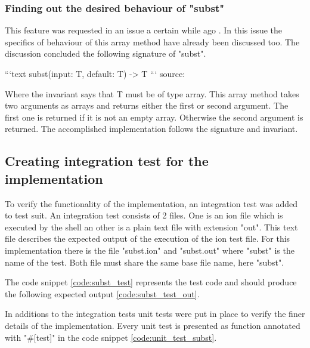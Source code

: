 \subsubsection{Finding out the desired behaviour of "subst"}\label{subst_desired_behaviour}

This feature was requested in an issue a certain while ago \cite{issue_subst_request}.
In this issue the specifics of behaviour of this array method have already been discussed too.
The discussion concluded the following signature of "subst".

```text
subst(input: T, default: T) -> T
```
source: \cite{issue_subst_request}

Where the invariant says that T must be of type array.
This array method takes two arguments as arrays and returns either the first or second argument.
The first one is returned if it is not an empty array. Otherwise the second argument is returned.
The accomplished implementation follows the signature and invariant.

\subsection{Creating integration test for the implementation}\label{subst_test}

To verify the functionality of the implementation, an integration test was added to test suit.
An integration test consists of 2 files. One is an ion file which is executed by the shell an other is a plain text file with extension "out".
This text file describes the expected output of the execution of the ion test file.
For this implementation there is the file "subst.ion" and "subst.out"
where "subst" is the name of the test. Both file must share the same base file name, here "subst".

The code snippet \ref{code:subst_test} represents the test code and should
produce the following expected output \ref{code:subst_test_out}.

In additions to the integration tests unit tests were put in place to verify the finer details of the implementation.
Every unit test is presented as function annotated with "\#[test]" in the code snippet \ref{code:unit_test_subst}.


